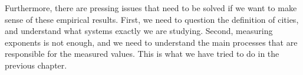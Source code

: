 Furthermore, there are pressing issues that need to be solved if we want to make
sense of these empirical results. First, we need to question the definition of
cities, and understand what systems exactly we are studying. Second, measuring
exponents is not enough, and we need to understand the main processes that are
responsible for the measured values. This is what we have tried to do in the
previous chapter.
